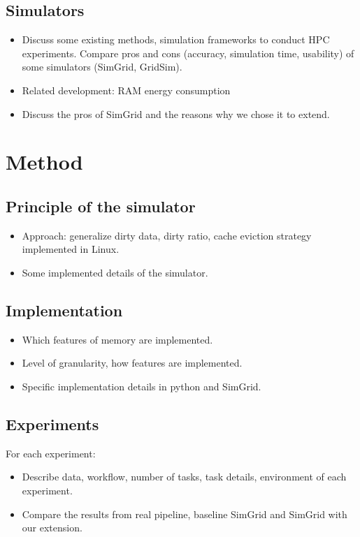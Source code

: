 \documentclass[conference]{IEEEtran}
\begin{document}
		\subsection{Simulators}
			\begin{itemize}
				\item Discuss some existing methods, simulation frameworks to conduct HPC experiments. Compare pros and cons (accuracy, simulation time, usability) of some simulators (SimGrid, GridSim).
				\item Related development: RAM energy consumption \cite{gill2019} \cite{ouarnoughi2017} 
				\item Discuss the pros of SimGrid and the reasons why we chose it to extend.
			\end{itemize}
			
	\section{Method}

		\subsection{Principle of the simulator}

			\begin{itemize}
				\item Approach: generalize dirty data, dirty ratio, cache eviction strategy implemented in Linux. 
				\item Some implemented details of the simulator.
			\end{itemize}

		\subsection{Implementation}
			\begin{itemize}
				\item Which features of memory are implemented.
				\item Level of granularity, how features are implemented.
				\item Specific implementation details in python and SimGrid.
			\end{itemize}

		\subsection{Experiments}
			For each experiment: 
			\begin{itemize}
				\item Describe data, workflow, number of tasks, task details, environment of each experiment.
				\item Compare the results from real pipeline, baseline SimGrid  and SimGrid with our extension.
			\end{itemize}
	
\end{document}
